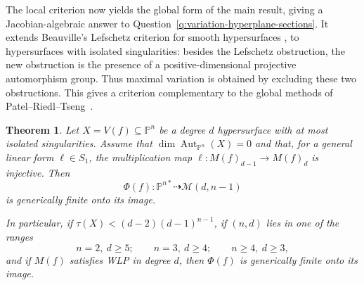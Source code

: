 \documentclass[11pt]{amsart}
\theoremstyle{plain}
\newtheorem{thm}[subsection]{Theorem}
\theoremstyle{definition}
\numberwithin{equation}{section}
\newcommand{\M}{{\mathcal M}}
\newcommand{\PP}{\mathbb{P}}
\DeclareMathOperator{\Aut}{Aut}
\begin{document}
The local criterion now yields the global form of the main result, giving a Jacobian-algebraic answer to Question~\ref{q:variation-hyperplane-sections}. It extends Beauville's Lefschetz criterion for smooth hypersurfaces
\cite[Proposition]{B}, \cite[Proposition~2]{B2} to hypersurfaces with isolated singularities: besides the Lefschetz obstruction, the new obstruction is the presence of a positive-dimensional projective automorphism group. Thus maximal variation is obtained by excluding these two obstructions. This gives a criterion complementary to the global methods of Patel--Riedl--Tseng~\cite{PRT}.
\begin{thm}
\label{thm:main-criterion}
Let $X=V(f)\subseteq\PP^n$ be a degree $d$ hypersurface with at most isolated
singularities. Assume that $\dim\Aut_{\PP^n}(X)=0$ and that, for a general
linear form $\ell\in S_1$, the multiplication map
$\ell:M(f)_{d-1}\to M(f)_d$ is injective. Then
\[
\Phi(f):\PP^{n*}\dashrightarrow \M(d,n-1)
\]
is generically finite onto its image.

In particular, if $\tau(X)<(d-2)(d-1)^{n-1}$, if $(n,d)$ lies in one of the
ranges
\[
n=2,\ d\geq5;\qquad n=3,\ d\geq4;\qquad n\geq4,\ d\geq3,
\]
and if $M(f)$ satisfies WLP in degree $d$, then $\Phi(f)$ is generically finite
onto its image.
\end{thm}
\end{document}
